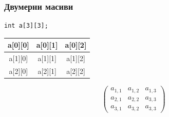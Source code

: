 \documentclass{beamer}
\begin{document}
\begin{frame}[fragile]
\frametitle{Двумерни масиви}

\begin{lstlisting}
int a[3][3];
\end{lstlisting}

\pause

\begin{center}

  
\begin{tabular}{ | c | c | c |}
\hline
a[0][0] & a[0][1] & a[0][2] \\\hline
a[1][0] & a[1][1] & a[1][2] \\\hline
a[2][0] & a[2][1] & a[2][2] \\\hline
  
\end{tabular}

\pause

\begin{equation*}
\begin{pmatrix}
  a_{1,1} & a_{1,2} & a_{1,3} \\
  a_{2,1} & a_{2,2} & a_{3,3} \\
  a_{3,1} & a_{3,2} & a_{3,3} 
\end{pmatrix}
\end{equation*}



\end{center}




\end{frame}
\end{document}
